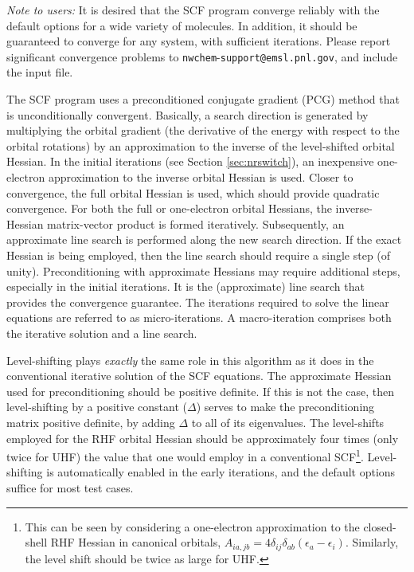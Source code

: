 {\em Note to users:} It is desired that the SCF program converge
reliably with the default options for a wide variety of molecules.  In
addition, it should be guaranteed to converge for any system, with
sufficient iterations.  Please report significant convergence problems
to \verb+nwchem+-\verb+support@+\-\verb+emsl.pnl.gov+, and include the
input file.


The SCF program uses a preconditioned conjugate gradient (PCG) method
that is unconditionally convergent.  Basically, a search direction is
generated by multiplying the orbital gradient (the derivative of the
energy with respect to the orbital rotations) by an approximation to
the inverse of the level-shifted orbital Hessian.  In the initial
iterations (see Section \ref{sec:nrswitch}), an inexpensive
one-electron approximation to the inverse orbital Hessian is used.
Closer to convergence, the full orbital Hessian is used, which should
provide quadratic convergence.  For both the full or one-electron
orbital Hessians, the inverse-Hessian matrix-vector product is formed
iteratively.  Subsequently, an approximate line search is performed
along the new search direction.  If the exact Hessian is being
employed, then the line search should require a single step (of
unity).  Preconditioning with approximate Hessians may require
additional steps, especially in the initial iterations.  It is the
(approximate) line search that provides the convergence guarantee.
The iterations required to solve the linear equations are referred to
as micro-iterations.  A macro-iteration comprises both the iterative
solution and a line search.

Level-shifting plays {\em exactly} the same role in this algorithm as
it does in the conventional iterative solution of the SCF equations.
The approximate Hessian used for preconditioning should be positive
definite.  If this is not the case, then level-shifting by a positive
constant ($\Delta$) serves to make the preconditioning matrix positive
definite, by adding $\Delta$ to all of its eigenvalues.  The
level-shifts employed for the RHF orbital Hessian should be
approximately four times (only twice for UHF) the value that one would
employ in a conventional SCF\footnote{This can be seen by considering
  a one-electron approximation to the closed-shell RHF Hessian in
  canonical orbitals, $A_{ia,jb} = 4 \delta_{ij} \delta_{ab}
  (\epsilon_a - \epsilon_i)$.  Similarly, the level shift
  should be twice as large for UHF.}.  Level-shifting is automatically enabled
in the early iterations, and the default options suffice for most test
cases.

